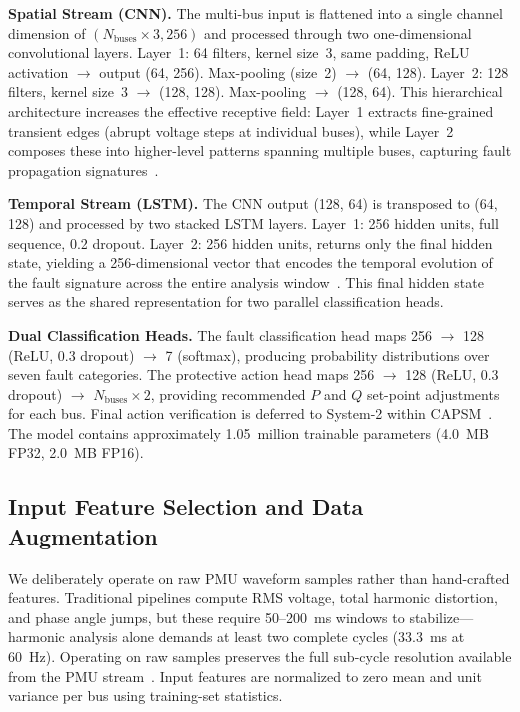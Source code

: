 \documentclass[journal]{IEEEtran}
\begin{document}
\textbf{Spatial Stream (CNN).} The multi-bus input is flattened into a single channel dimension of $(N_{\text{buses}} \times 3, 256)$ and processed through two one-dimensional convolutional layers. Layer~1: 64 filters, kernel size~3, same padding, ReLU activation $\rightarrow$ output (64, 256). Max-pooling (size~2) $\rightarrow$ (64, 128). Layer~2: 128 filters, kernel size~3 $\rightarrow$ (128, 128). Max-pooling $\rightarrow$ (128, 64). This hierarchical architecture increases the effective receptive field: Layer~1 extracts fine-grained transient edges (abrupt voltage steps at individual buses), while Layer~2 composes these into higher-level patterns spanning multiple buses, capturing fault propagation signatures~\cite{ref26}.

\textbf{Temporal Stream (LSTM).} The CNN output (128, 64) is transposed to (64, 128) and processed by two stacked LSTM layers. Layer~1: 256 hidden units, full sequence, 0.2 dropout. Layer~2: 256 hidden units, returns only the final hidden state, yielding a 256-dimensional vector that encodes the temporal evolution of the fault signature across the entire analysis window~\cite{ref10}. This final hidden state serves as the shared representation for two parallel classification heads.

\textbf{Dual Classification Heads.} The fault classification head maps 256 $\rightarrow$ 128 (ReLU, 0.3 dropout) $\rightarrow$ 7 (softmax), producing probability distributions over seven fault categories. The protective action head maps 256 $\rightarrow$ 128 (ReLU, 0.3 dropout) $\rightarrow$ $N_{\text{buses}} \times 2$, providing recommended $P$ and $Q$ set-point adjustments for each bus. Final action verification is deferred to System-2 within CAPSM~\cite{ref15}. The model contains approximately 1.05~million trainable parameters (4.0~MB FP32, 2.0~MB FP16).

\subsection{Input Feature Selection and Data Augmentation}

We deliberately operate on raw PMU waveform samples rather than hand-crafted features. Traditional pipelines compute RMS voltage, total harmonic distortion, and phase angle jumps, but these require 50--200~ms windows to stabilize---harmonic analysis alone demands at least two complete cycles (33.3~ms at 60~Hz). Operating on raw samples preserves the full sub-cycle resolution available from the PMU stream~\cite{ref5}. Input features are normalized to zero mean and unit variance per bus using training-set statistics.
\end{document}
